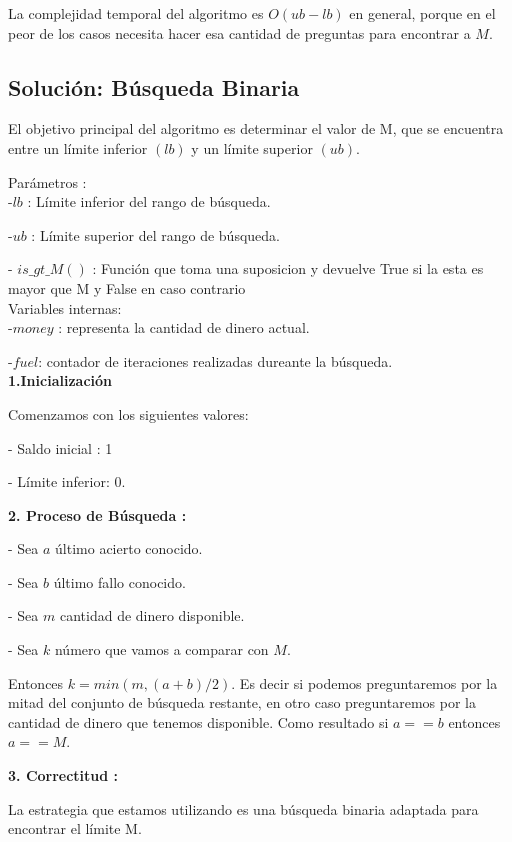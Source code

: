 \documentclass[
10pt, %
a4paper, %
oneside, %
headinclude,footinclude, %
BCOR5mm, %
]{scrartcl}
\begin{document}
La complejidad temporal del algoritmo es $O (ub-lb)$ en general, porque en el peor de los casos necesita hacer
esa cantidad de preguntas para encontrar a $M$.

\subsection{Solución: Búsqueda Binaria}
El objetivo principal del algoritmo es determinar el valor de M, que se encuentra entre un límite inferior $(lb)$ y un límite superior $(ub)$. 

Parámetros :\\

-$lb$ : Límite inferior del rango de búsqueda.


-$ub$ : Límite superior del rango de búsqueda.


- $is\_gt\_M()$ : Función que toma una suposicion y devuelve True si la esta es mayor que M y False en caso contrario\\

Variables internas: \\

-$money$ : representa la cantidad de dinero actual.

-$fuel$: contador de iteraciones realizadas dureante la búsqueda. \\

\textbf{1.Inicialización}
 
Comenzamos con los siguientes valores:

- Saldo inicial : 1


- Límite inferior: 0.

\textbf{2. Proceso de Búsqueda :} 

- Sea $a$ último acierto conocido.

- Sea $b$ último fallo conocido.

- Sea $m$ cantidad de dinero disponible.

- Sea $k$ número que vamos a comparar 
con $M$.


Entonces $k = min(m, (a+b)/2)$. Es 
decir si podemos preguntaremos por la 
mitad del conjunto de búsqueda 
restante, en otro caso preguntaremos 
por la cantidad de dinero que tenemos 
disponible. Como resultado si $a == b$ 
entonces $a == M$.


\textbf{3. Correctitud :} 

La estrategia que estamos utilizando es una búsqueda binaria adaptada para encontrar el límite M.\\
\end{document}
